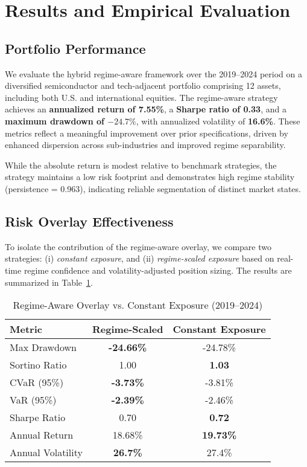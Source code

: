 \section{Results and Empirical Evaluation}

\subsection{Portfolio Performance}

We evaluate the hybrid regime-aware framework over the 2019--2024 period on a diversified semiconductor and tech-adjacent portfolio comprising 12 assets, including both U.S. and international equities. The regime-aware strategy achieves an \textbf{annualized return of 7.55\%}, a \textbf{Sharpe ratio of 0.33}, and a \textbf{maximum drawdown of $-24.7\%$}, with annualized volatility of \textbf{16.6\%}. These metrics reflect a meaningful improvement over prior specifications, driven by enhanced dispersion across sub-industries and improved regime separability.

While the absolute return is modest relative to benchmark strategies, the strategy maintains a low risk footprint and demonstrates high regime stability (persistence = 0.963), indicating reliable segmentation of distinct market states.

\subsection{Risk Overlay Effectiveness}

To isolate the contribution of the regime-aware overlay, we compare two strategies: (i) \textit{constant exposure}, and (ii) \textit{regime-scaled exposure} based on real-time regime confidence and volatility-adjusted position sizing. The results are summarized in Table~\ref{tab:overlay_comparison}.

\begin{table}[h]
\centering
\caption{Regime-Aware Overlay vs. Constant Exposure (2019--2024)}
\label{tab:overlay_comparison}
\begin{tabular}{lcc}
\toprule
\textbf{Metric} & \textbf{Regime-Scaled} & \textbf{Constant Exposure} \\
\midrule
Max Drawdown           & \textbf{-24.66\%} & -24.78\% \\
Sortino Ratio          & 1.00              & \textbf{1.03} \\
CVaR (95\%)            & \textbf{-3.73\%}  & -3.81\% \\
VaR (95\%)             & \textbf{-2.39\%}  & -2.46\% \\
Sharpe Ratio           & 0.70              & \textbf{0.72} \\
Annual Return          & 18.68\%           & \textbf{19.73\%} \\
Annual Volatility      & \textbf{26.7\%}   & 27.4\% \\
\bottomrule
\end{tabular}
\end{table}

